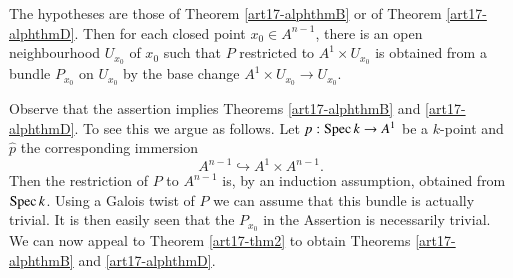 \begin{assertion}\label{art17-assertion1}
The hypotheses are those of Theorem \ref{art17-alphthmB} or of Theorem \ref{art17-alphthmD}. Then for each closed point $x_0 \in A^{n-1}$, there is an open neighbourhood $U_{x_0}$ of $x_0$ such that $P$ restricted to $A^1 \times U_{x_0}$ is obtained from a bundle $P_{x_0}$ on $U_{x_0}$ by the base change $A^1 \times U_{x_0} \to U_{x_0}$.
\end{assertion}

Observe that the assertion implies Theorems \ref{art17-alphthmB} and \ref{art17-alphthmD}. To see this we argue as follows. Let $p: \operatorname{Spec} k \to A^1$ be a $k$-point and $\hat{p}$ the corresponding immersion
$$
A^{n-1} \hookrightarrow A^1 \times A^{n-1}.
$$
Then the restriction of $P$ to $A^{n-1}$ is, by an induction assumption, obtained from $\operatorname{Spec} k$. Using a Galois twist of $P$ we can assume that this bundle is actually trivial. It is then easily seen that the $P_{x_0}$ in the Assertion is necessarily trivial. We can now appeal to Theorem \ref{art17-thm2} to obtain Theorems \ref{art17-alphthmB} and \ref{art17-alphthmD}.

